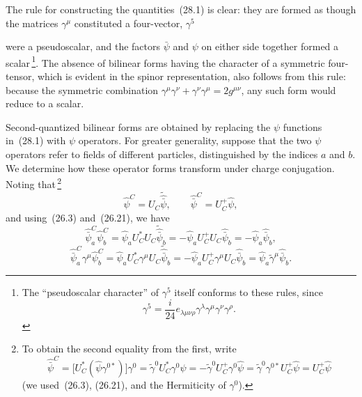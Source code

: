 The rule for constructing the quantities~(28.1) is clear: they are formed as though the matrices $\gamma^\mu$ constituted a four-vector, $\gamma^5$

were a pseudoscalar, and the factors $\bar\psi$ and $\psi$ on either side together formed a scalar\,\footnote{The ``pseudoscalar character'' of $\gamma^5$ itself conforms to these rules, since
\[
\gamma^5 = \frac{i}{24}e_{\lambda\mu\nu\rho}\gamma^\lambda\gamma^\mu\gamma^\nu\gamma^\rho.
\]}. The absence of bilinear forms having the character of a symmetric four-tensor, which is evident in the spinor representation, also follows from this rule: because the symmetric combination $\gamma^\mu\gamma^\nu + \gamma^\nu\gamma^\mu = 2g^{\mu\nu}$, any such form would reduce to a scalar.

Second-quantized bilinear forms are obtained by replacing the $\psi$ functions in~(28.1) with $\psi$ operators. For greater generality, suppose that the two $\psi$ operators refer to fields of different particles, distinguished by the indices $a$ and $b$. We determine how these operator forms transform under charge conjugation. Noting that\,\footnote{To obtain the second equality from the first, write
\[
\widehat{\bar\psi}^C = \bigl[U_C^*(\widehat\psi\gamma^{0*})\bigr]\gamma^0 = \widetilde\gamma^0U_C^*\gamma^0\widehat\psi = -\widetilde\gamma^0U_C^+\gamma^0\widehat\psi = \widetilde\gamma^0\gamma^{0*}U_C^+\widehat\psi = U_C^+\widehat\psi
\]
(we used~(26.3), (26.21), and the Hermiticity of $\gamma^0$).}
\begin{equation}
\widehat\psi^C = U_C\widetilde{\widehat{\bar\psi}},\qquad \widehat{\bar\psi}^C = U_C^+\widehat\psi,
\tag{28.3}
\end{equation}
and using~(26.3) and~(26.21), we have
\[
\widehat{\bar\psi}^C_a\widehat\psi^C_b = \widehat\psi_a U_C^* U_C\widetilde{\widehat{\bar\psi}}_b = -\widehat\psi_a U_C^+ U_C\widehat{\bar\psi}_b = -\widehat\psi_a\widehat{\bar\psi}_b,
\]
\[
\widehat{\bar\psi}^C_a\gamma^\mu\widehat\psi^C_b = \widehat\psi_a U_C^*\gamma^\mu U_C\widetilde{\widehat{\bar\psi}}_b = -\widehat\psi_a U_C^+\gamma^\mu U_C\widehat{\bar\psi}_b = \widehat\psi_a\widetilde\gamma^\mu\widehat{\bar\psi}_b.
\]

